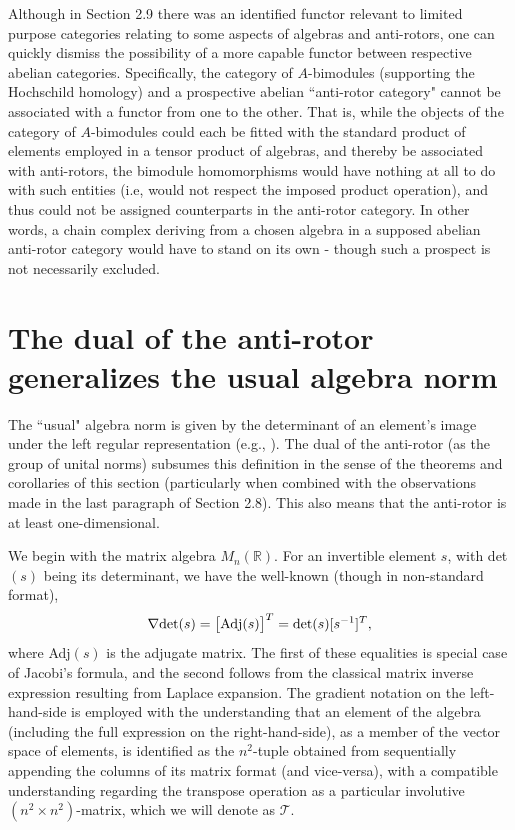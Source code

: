 \documentclass{amsart}
\numberwithin{equation}{section}
\theoremstyle{definition}
\numberwithin{theorem}{section}
\begin{document}
Although in Section 2.9 there was an identified functor relevant to limited purpose categories relating to some aspects of algebras and anti-rotors, one can quickly dismiss the possibility of a more capable functor between respective abelian categories.  Specifically, the category of $A$-bimodules (supporting the Hochschild homology) and a prospective abelian ``anti-rotor category" cannot be associated with a functor from one to the other.  That is, while the objects of the category of $A$-bimodules could each be fitted with the standard product of elements employed in a tensor product of algebras, and thereby be associated with anti-rotors, the bimodule homomorphisms would have nothing at all to do with such entities (i.e, would not respect the imposed product operation), and thus could not be assigned counterparts in the anti-rotor category.  In other words, a chain complex deriving from a chosen algebra in a supposed abelian anti-rotor category would have to stand on its own - though such a prospect is not necessarily excluded.


\section{The dual of the anti-rotor generalizes the usual algebra norm} 

The ``usual" algebra norm is given by the determinant of an element's image under the left regular representation (e.g., \cite{bourbaki:1989}).  The dual of the anti-rotor (as the group of unital norms) subsumes this definition in the sense of the theorems and corollaries of this section (particularly when combined with the observations made in the last paragraph of Section 2.8).  This also means that the anti-rotor is at least one-dimensional.

 We begin with the matrix algebra $ M_n(\mathbb{R})$. For an invertible element $s$, with det$(s)$ being its determinant, we have the well-known (though in non-standard format),
  \begin{equation}\label{11/5/21.1} \nabla \mbox{det}(s) = \big[{\rm Adj}(s)\big]^T = \mbox{det}(s)[s^{-1}]^T,\end{equation} where Adj$(s)$ is the adjugate matrix.  The first of these equalities is special case of Jacobi's formula, and the second follows from the classical matrix inverse expression resulting from Laplace expansion.  The gradient notation on the left-hand-side is employed with the understanding that an element of the algebra (including the full expression on the right-hand-side), as a member of the vector space of elements, is identified as the $n^2$-tuple obtained from sequentially appending the columns of its matrix format (and vice-versa), with a compatible understanding  regarding the transpose operation as a particular involutive $(n^2\times n^2)$-matrix, which we will denote as $\mathcal{T}$. 
  
\end{document}
